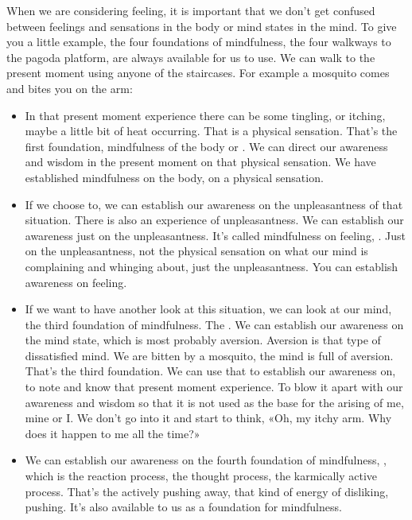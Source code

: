 \documentclass[letterpaper,10pt,english]{sphinxmanual}
\begin{document}
\sphinxAtStartPar
When we are considering feeling, it is important that we don’t get confused between feelings and sensations in the body or mind states in the mind.
To give you a little example, the four foundations of mindfulness, the four
walkways to the pagoda platform, are always available for us to use. We can
walk to the present moment using anyone of the staircases. For example a
mosquito comes and bites you on the arm:
\begin{itemize}
\item {} 
\sphinxAtStartPar
{} In that present moment experience there can be some tingling, or itching, maybe a little bit of heat occurring. That is a physical sensation.
That’s the first foundation, mindfulness of the body or
. We can direct our awareness and wisdom in the present moment on
that physical sensation. We have established mindfulness on the body,
on a physical sensation.

\item {} 
\sphinxAtStartPar
If we choose to, we can establish our awareness on the unpleasantness
of that situation. There is also an experience of unpleasantness. We can
establish  our  awareness  just  on  the  unpleasantness.  It’s  called  mindfulness on feeling,
. Just on the unpleasantness, not
the physical sensation on what our mind is complaining and whinging
about, just the unpleasantness. You can establish awareness on feeling.

\item {} 
\sphinxAtStartPar
If we want to have another look at this situation, we can look at our
mind,  the  third  foundation  of  mindfulness.  The
.  We
can establish our awareness on the mind state, which is most probably
aversion. Aversion is that type of dissatisfied mind. We are bitten by
a  mosquito,  the  mind  is  full  of  aversion. That’s  the  third  foundation.
We can use that to establish our awareness on, to note and know that
present moment experience. To blow it apart with our awareness and
wisdom so that it is not used as the base for the arising of me, mine or
I. We don’t go into it and start to think, «Oh, my itchy arm. Why does
it happen to me all the time?»

\item {} 
\sphinxAtStartPar
We can establish our awareness on the fourth foundation of mindfulness,
,  which  is  the  reaction  process,  the  thought
process,  the  karmically  active  process.  That’s  the  actively  pushing
away, that kind of energy of disliking, pushing. It’s also available to us
as a foundation for mindfulness.

\end{itemize}
\end{document}
